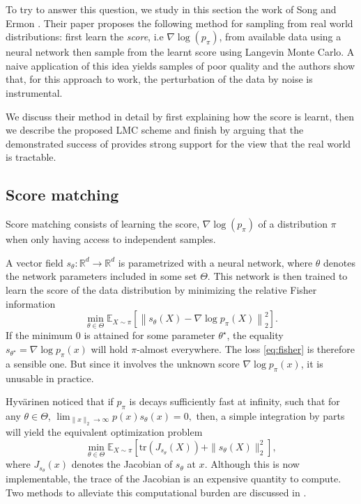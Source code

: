 \documentclass[10pt,journal,a4paper]{IEEEtran}
\theoremstyle{definition}
\newcommand{\E}{\mathbb{E}}
\newcommand{\R}{\mathbb{R}}
\begin{document}
To try to answer this question, we study in this section the work of Song and Ermon \cite{song_generative_2019}. Their paper proposes the following method for sampling from real world distributions:  first learn the \textit{score}, i.e $\nabla \log(p_\pi)$, from available data using a neural network then sample from the learnt score using Langevin Monte Carlo. A naive application of this idea yields samples of poor quality and the authors show that, for this approach to work, the perturbation of the data by noise is instrumental.

We discuss their method in detail by first explaining how the score is learnt, then we describe the proposed LMC scheme and finish by arguing that the demonstrated success of \cite{song_generative_2019} provides strong support for the view that the real world is tractable.

\subsection{Score matching}

Score matching consists of learning the score, $\nabla \log(p_\pi)$ of a distribution $\pi$ when only having access to independent samples.

A vector field $s_\theta: \R^d \rightarrow \R^d$ is parametrized with a neural network, where $\theta$ denotes the network parameters included in some set $\Theta$. This network is then trained to learn the score of the data distribution by minimizing the relative Fisher information 
\begin{equation}
\min_{\theta \in \Theta} \E_{X \sim \pi} \left[ \left\| s_\theta(X) - \nabla \log p_\pi(X) \right\|_2^2\right].
\label{eq:fisher}
\end{equation}
If the minimum $0$ is attained for some parameter $\theta^\star$, the equality $s_{\theta^\star} = \nabla \log p_\pi(x)$ will hold $\pi$-almost everywhere. The loss \eqref{eq:fisher} is therefore a sensible one. But since it involves the unknown score $\nabla \log p_\pi(x)$, it is unusable in practice.

Hyv\"arinen \cite{hyvarinen_estimation_2005} noticed that if $p_\pi$ is decays sufficiently fast at infinity, such that for any $\theta \in \Theta$,
\(
 \lim_{\|x\|_2 \rightarrow \infty} p(x)s_\theta(x) =0,
\)
then, a simple integration by parts will yield the equivalent optimization problem
\begin{equation}
\min_{\theta \in \Theta} \E_{X \sim \pi} \left[ \text{tr}(J_{s_\theta}(X)) + \|s_\theta(X)\|_2^2\right],
\label{eq:tractable-score}
\end{equation}
where $J_{s_\theta}(x)$ denotes the Jacobian of $s_\theta$ at $x$. Although this is now implementable, the trace of the Jacobian is an expensive quantity to compute. Two methods to alleviate this computational burden are discussed in \cite{song_generative_2019}.
\end{document}

